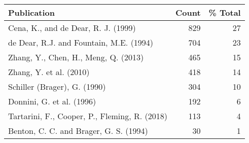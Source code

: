 \begin{tabular}{lrr}
\toprule
Publication & Count & \% Total \\
\midrule
Cena, K., and de Dear, R. J. (1999) & 829 & 27 \\
de Dear, R.J. and Fountain, M.E. (1994) & 704 & 23 \\
Zhang, Y., Chen, H., Meng, Q. (2013) & 465 & 15 \\
Zhang, Y. et al. (2010) & 418 & 14 \\
Schiller (Brager), G. (1990) & 304 & 10 \\
Donnini, G. et al. (1996) & 192 & 6 \\
Tartarini, F., Cooper, P., Fleming, R. (2018) & 113 & 4 \\
Benton, C. C. and Brager, G. S. (1994) & 30 & 1 \\
\bottomrule
\end{tabular}
